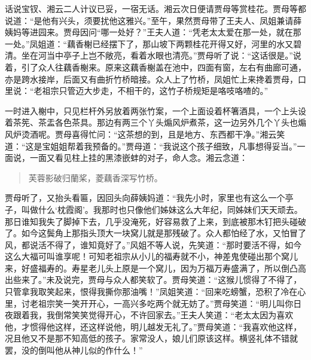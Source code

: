 \documentclass[12pt,oneside]{book}
\newenvironment{shici}{%
\begin{verse}%
\centering\large\hspace{12pt}}%
{\end{verse}}
\begin{document}
话说宝钗、湘云二人计议已妥，一宿无话。湘云次日便请贾母等赏桂花。贾母等都说道：“是他有兴头，须要扰他这雅兴。”至午，果然贾母带了王夫人、凤姐兼请薛姨妈等进园来。贾母因问“哪一处好？”王夫人道：“凭老太太爱在那一处，就在那一处。”凤姐道：“藕香榭已经摆下了，那山坡下两颗桂花开得又好，河里的水又碧清。坐在河当中亭子上岂不敞亮，看着水眼也清亮。”贾母听了说：“这话很是。”说着，引了众人往藕香榭来。原来这藕香榭盖在池中，四面有窗，左右有曲廊可通，亦是跨水接岸，后面又有曲折竹桥暗接。众人上了竹桥，凤姐忙上来搀着贾母，口里说：“老祖宗只管迈大步走，不相干的，这竹子桥规矩是咯吱咯喳的。”

一时进入榭中，只见栏杆外另放着两张竹案，一个上面设着杯箸酒具，一个上头设着茶筅、茶盂各色茶具。那边有两三个丫头煽风炉煮茶，这一边另外几个丫头也煽风炉烫酒呢。贾母喜得忙问：“这茶想的到，且是地方、东西都干净。”湘云笑道：“这是宝姐姐帮着我预备的。”贾母道：“我说这个孩子细致，凡事想得妥当。”一面说，一面又看见柱上挂的黑漆嵌蚌的对子，命人念。湘云念道：

\begin{shici}
芙蓉影破归蘭桨，菱藕香深写竹桥。
\end{shici}


贾母听了，又抬头看匾，因回头向薛姨妈道：“我先小时，家里也有这么一个亭子，叫做什么‘枕霞阁’。我那时也只像他们姊妹这么大年纪，同姊妹们天天顽去。那日谁知我失了脚掉下去，几乎没淹死，好容易救了上来，到底被那木钉把头碰破了。如今这鬓角上那指头顶大一块窝儿就是那残破了。众人都怕经了水，又怕冒了风，都说活不得了，谁知竟好了。”风姐不等人说，先笑道：“那时要活不得，如今这么大福可叫谁享呢！可知老祖宗从小儿的福寿就不小，神差鬼使碰出那个窝儿来，好盛福寿的。寿星老儿头上原是一个窝儿，因为万福万寿盛满了，所以倒凸高出些来了。”未及说完，贾母与众人都笑软了。贾母笑道：“这猴儿惯得了不得了，只管拿我取笑起来，恨得我撕你那油嘴！”凤姐笑道：“回来吃螃蟹，恐积了冷在心里，讨老祖宗笑一笑开开心，一高兴多吃两个就无妨了。”贾母笑道：“明儿叫你日夜跟着我，我倒常笑笑觉得开心，不许回家去。”王夫人笑道：“老太太因为喜欢他，才惯得他这样，还这样说他，明儿越发无礼了。”贾母笑道：“我喜欢他这样，况且他又不是那不知高低的孩子。家常没人，娘儿们原该这样。横竖礼体不错就罢，没的倒叫他从神儿似的作什么！”
\end{document}
